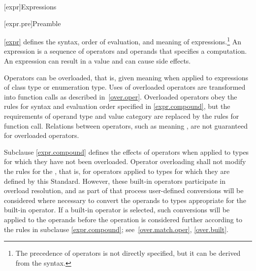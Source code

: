 [expr]{Expressions}


%
%
%
%
%
%
%

[expr.pre]{Preamble}

\pnum
{}%
\begin{note}
\ref{expr} defines the syntax, order of evaluation, and meaning
of expressions.\footnote{The precedence of operators is not directly specified, but it can be
derived from the syntax.}
An expression is a sequence of operators and operands that specifies a
computation. An expression can result in a value and can cause side
effects.
\end{note}

\pnum
{}%
\begin{note}
Operators can be overloaded, that is, given meaning when applied to
expressions of class type or enumeration
type. Uses of overloaded operators are transformed into
function calls as described in~\ref{over.oper}. Overloaded operators
obey the rules for syntax and evaluation order specified in \ref{expr.compound},
but the requirements of operand type and value category are replaced
by the rules for function call. Relations between operators, such as
 meaning , are not guaranteed for overloaded
operators.
\end{note}

\pnum
Subclause \ref{expr.compound} defines the effects of operators when applied to types
for which they have not been overloaded. Operator overloading shall not
modify the rules for the ,
that is, for operators applied to types for which they are defined by this
Standard. However, these built-in operators participate in overload
resolution, and as part of that process user-defined conversions will be
considered where necessary to convert the operands to types appropriate
for the built-in operator. If a built-in operator is selected, such
conversions will be applied to the operands before the operation is
considered further according to the rules in subclause \ref{expr.compound};
see~\ref{over.match.oper}, \ref{over.built}.

